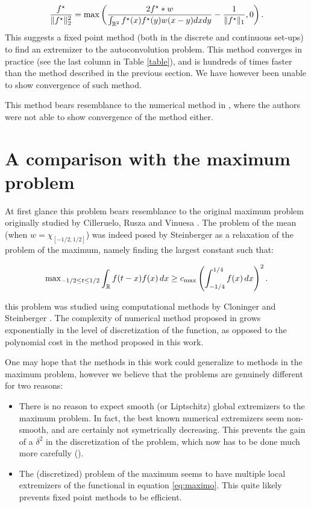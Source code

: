 	\begin{equation}\label{euler-lagrange-2}
		 \frac {f^\star} {\|f^\star\|_2^2} =  \max\left (\frac{2 f^\star\ast w}{\int_{\mathbb R^2} f^\star(x)f^\star(y) w(x-y) dx dy}  - \frac 1 {\|f^\star\|_1},0\right ).
	\end{equation}
This suggests a fixed point method (both in the discrete and continuous set-ups) to find an extremizer to the autoconvolution problem. This method converges in practice (see the last column in Table \ref{table}), and is hundreds of times faster than the method described in the previous section. We have however been unable to show convergence of such method. 

This method bears resemblance to the numerical method in \cite{CDGJLM}, where the authors were not able to show convergence of the method either.

\section{A comparison with the maximum problem}

At first glance this problem bears resemblance to the original maximum problem originally studied by Cilleruelo, Rusza and Vinuesa \cite{CRV}. The problem of the mean (when $w = \chi_{[-1/2,1/2]}$) was indeed posed by Steinberger as a relaxation of the problem of the maximum, namely finding the largest constant such that:

\begin{equation}
    \label{eq:maximo}
\text{max}_{-1/2 \le t \le 1/2} \int_{{\mathbb R}} f(t-x)f(x) \, dx \ge c_{\max} \left(\int_{-1/4}^{1/4} f(x) \, dx\right)^2.
\end{equation}

this problem was studied using computational methods by Cloninger and Steinberger \cite{CS}. The complexity of numerical method proposed in \cite{CS} grows exponentially in the level of discretization of the function, as opposed to the polynomial cost in the method proposed in this work.

One may hope that the methods in this work could generalize to methods in the maximum problem, however we believe that the problems are genuinely different for two reasons:

\begin{itemize}
    \item There is no reason to expect smooth (or Liptschitz) global extremizers to the maximum problem. In fact, the best known numerical extremizers \cite[Figure 1]{MV} seem non-smooth, and are certainly not symetrically decreasing. This prevents the gain of a $\delta^2$ in the discretization of the problem, which now has to be done much more carefully (\cite[Lemma 1]{CS}). 
    \item The (discretized) problem of the maximum seems to have multiple local extremizers of the functional in equation \eqref{eq:maximo}. This quite likely prevents fixed point methods to be efficient.  
\end{itemize}